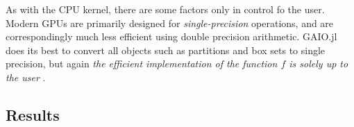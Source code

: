 As with the CPU kernel, there are some factors only in control fo the user. Modern GPUs 
are primarily designed for \emph{single-precision} operations, and are correspondingly 
much less efficient using double precision arithmetic. GAIO.jl does its best to convert 
all objects such as partitions and box sets to single precision, but again \emph{
the efficient implementation of the function $f$ is solely up to the user
}.


\subsection{Results}

